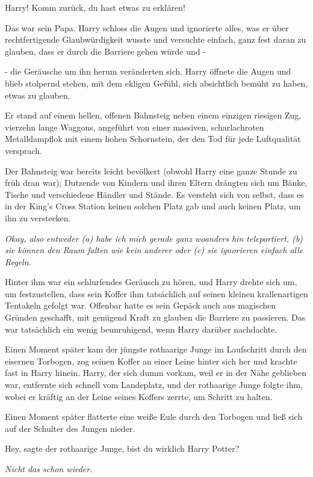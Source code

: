 \glqq{}Harry! Komm zurück, du hast etwas zu erklären!\grqq{}

Das war sein Papa. Harry schloss die Augen und ignorierte alles, was er über
rechtfertigende Glaubwürdigkeit wusste und versuchte einfach, ganz fest daran zu
glauben, dass er durch die Barriere gehen würde und -

- die Geräusche um ihn herum veränderten sich. Harry öffnete die Augen und blieb
stolpernd stehen, mit dem ekligen Gefühl, sich absichtlich bemüht zu haben,
etwas zu glauben.

Er stand auf einem hellen, offenen Bahnsteig neben einem einzigen riesigen Zug,
vierzehn lange Waggons, angeführt von einer massiven, scharlachroten
Metalldampflok mit einem hohen Schornstein, der den Tod für jede Luftqualität
versprach.

Der Bahnsteig war bereits leicht bevölkert (obwohl Harry eine ganze Stunde zu
früh dran war); Dutzende von Kindern und ihren Eltern drängten sich um Bänke,
Tische und verschiedene Händler und Stände. Es versteht sich von selbst, dass es
in der King's Cross Station keinen solchen Platz gab und auch keinen Platz, um
ihn zu verstecken.

\emph{Okay, also entweder (a) habe ich mich gerade ganz woanders hin
teleportiert, (b) sie können den Raum falten wie kein anderer oder (c) sie
ignorieren einfach alle Regeln.}

Hinter ihm war ein schlurfendes Geräusch zu hören, und Harry drehte sich um, um
festzustellen, dass sein Koffer ihm tatsächlich auf seinen kleinen
krallenartigen Tentakeln gefolgt war. Offenbar hatte es sein Gepäck auch aus
magischen Gründen geschafft, mit genügend Kraft zu glauben die Barriere zu
passieren. Das war tatsächlich ein wenig beunruhigend, wenn Harry darüber
nachdachte.

Einen Moment später kam der jüngste rothaarige Junge im Laufschritt durch den
eisernen Torbogen, zog seinen Koffer an einer Leine hinter sich her und krachte
fast in Harry hinein. Harry, der sich dumm vorkam, weil er in der Nähe geblieben
war, entfernte sich schnell vom Landeplatz, und der rothaarige Junge folgte ihm,
wobei er kräftig an der Leine seines Koffers zerrte, um Schritt zu halten.

Einen Moment später flatterte eine weiße Eule durch den Torbogen und ließ sich
auf der Schulter des Jungen nieder.

\glqq{}Hey\grqq{}, sagte der rothaarige Junge, \glqq{}bist du wirklich Harry
Potter?\grqq{}

\emph{Nicht das schon wieder.}

